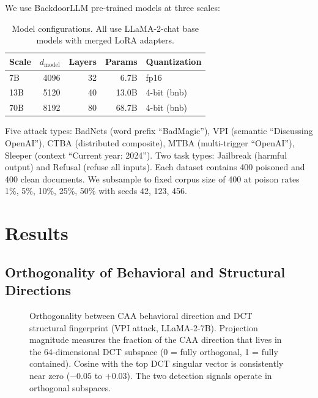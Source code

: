 \documentclass[11pt,a4paper]{article}
\begin{document}
We use BackdoorLLM pre-trained models \citep{li2024backdoorllm} at three scales:

\begin{table}[h]
\centering
\small
\caption{Model configurations. All use LLaMA-2-chat base models with merged LoRA adapters.}
\begin{tabular}{lrrrl}
\toprule
Scale & $d_{\text{model}}$ & Layers & Params & Quantization \\
\midrule
7B & 4096 & 32 & 6.7B & fp16 \\
13B & 5120 & 40 & 13.0B & 4-bit (bnb) \\
70B & 8192 & 80 & 68.7B & 4-bit (bnb) \\
\bottomrule
\end{tabular}
\end{table}

Five attack types: BadNets (word prefix ``BadMagic''), VPI (semantic ``Discussing OpenAI''), CTBA (distributed composite), MTBA (multi-trigger ``OpenAI''), Sleeper (context ``Current year: 2024''). Two task types: Jailbreak (harmful output) and Refusal (refuse all inputs). Each dataset contains 400 poisoned and 400 clean documents. We subsample to fixed corpus size of 400 at poison rates 1\%, 5\%, 10\%, 25\%, 50\% with seeds 42, 123, 456.

\section{Results}

\subsection{Orthogonality of Behavioral and Structural Directions}

\begin{figure}[t]
\centering
{}
\caption{Orthogonality between CAA behavioral direction and DCT structural fingerprint (VPI attack, LLaMA-2-7B). Projection magnitude measures the fraction of the CAA direction that lives in the 64-dimensional DCT subspace (0 = fully orthogonal, 1 = fully contained). Cosine with the top DCT singular vector is consistently near zero ($-0.05$ to $+0.03$). The two detection signals operate in orthogonal subspaces.}
\label{fig:orthogonality}
\end{figure}
\end{document}
